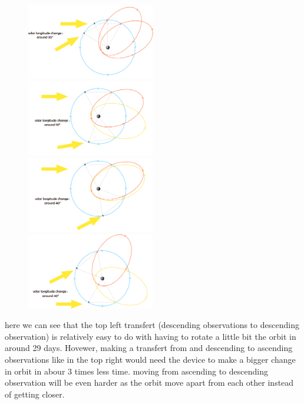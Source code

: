 \documentclass[11pt]{article} %
\begin{document}
			\begin{figure}[h]
				\includegraphics[width=0.5\textwidth]{images/1in2obs.png}
				\includegraphics[width=0.5\textwidth]{images/odd_to_even.png}
				\includegraphics[width=0.5\textwidth]{images/1in3_obs.png}
				\includegraphics[width=0.5\textwidth]{images/1in3_bad.png}
			\end{figure}
			
			here we can see that the top left transfert (descending observations to descending observation) is relatively easy to do with having to rotate a little bit the orbit in around 29 days. Hovewer, making a transfert from and descending to ascending observations like in the top right  would need the device to make a bigger change in orbit in abour 3 times less time. moving from ascending to descending observation will be even harder as the orbit move apart from each other instead of getting closer.
			
\end{document}
